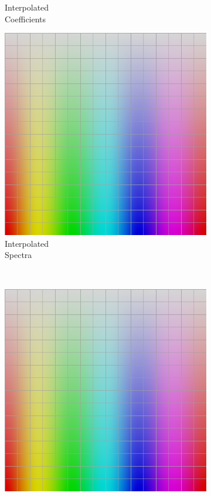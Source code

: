 \begin{figure}[t]
\begin{subfigure}[t]{0.22\textwidth}
		\caption{Interpolated\\Coefficients}
		\label{fig:sigUpliftInterpCoeff}
	\end{subfigure} \hspace{0.05em}
	\begin{subfigure}[t]{0.22\textwidth}
		\includegraphics[width=\linewidth]{img/uplifting_texture_interpSpectra.png}
		\caption{Interpolated\\Spectra}
		\label{fig:sigUpliftInterpSpectra}
	\end{subfigure}
	\vspace{0.5em}\\
	\begin{subfigure}[t]{0.22\textwidth}
		\includegraphics[width=\linewidth]{img/uplifting_texture_original.png}

\end{subfigure}
\end{figure}
